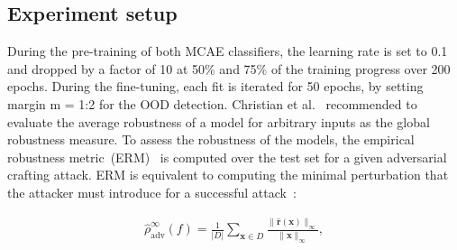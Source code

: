 \subsection{Experiment setup}
During the pre-training of both MCAE classifiers, the learning rate is set to 0.1 and dropped by a factor of 10 at 50\% and 75\% of the training progress over 200 epochs. During the fine-tuning, each fit is iterated for 50 epochs, by setting margin m = 1:2 for the OOD detection. %
Christian et al.~\cite{RobustnessNotEnough} recommended to evaluate the average robustness of a model for arbitrary inputs as the global robustness measure. To assess the robustness of the models, the empirical robustness metric~(ERM)~\cite{moosavi2016deepfool} is computed over the test set for a given adversarial crafting attack. ERM is equivalent to computing the minimal perturbation that the attacker must introduce for a successful attack~\cite{moosavi2016deepfool}:

\vspace{-4mm}
\begin{align}
    \hat{\rho}_{\mathrm{adv}}^{\infty}(f)=\frac{1}{|D|} \sum_{\boldsymbol{x} \in D} \frac{\|\hat{\boldsymbol{r}}(\boldsymbol{x})\|
    _{\infty}}{\|\boldsymbol{x}\|_{\infty}},
\end{align}

